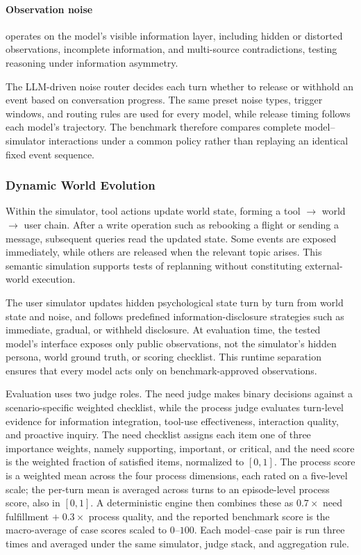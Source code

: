 \paragraph{Observation noise} operates on the model's visible information layer, including hidden or distorted observations, incomplete information, and multi-source contradictions, testing reasoning under information asymmetry.

The LLM-driven noise router decides each turn whether to release or withhold an event based on conversation progress. The same preset noise types, trigger windows, and routing rules are used for every model, while release timing follows each model's trajectory. The benchmark therefore compares complete model--simulator interactions under a common policy rather than replaying an identical fixed event sequence.

\subsubsection{Dynamic World Evolution}
\label{sec:livingbench_world}

Within the simulator, tool actions update world state, forming a tool $\to$ world $\to$ user chain. After a write operation such as rebooking a flight or sending a message, subsequent queries read the updated state. Some events are exposed immediately, while others are released when the relevant topic arises. This semantic simulation supports tests of replanning without constituting external-world execution.

The user simulator updates hidden psychological state turn by turn from world state and noise, and follows predefined information-disclosure strategies such as immediate, gradual, or withheld disclosure. At evaluation time, the tested model's interface exposes only public observations, not the simulator's hidden persona, world ground truth, or scoring checklist. This runtime separation ensures that every model acts only on benchmark-approved observations.

Evaluation uses two judge roles. The need judge makes binary decisions against a scenario-specific weighted checklist, while the process judge evaluates turn-level evidence for information integration, tool-use effectiveness, interaction quality, and proactive inquiry. The need checklist assigns each item one of three importance weights, namely supporting, important, or critical, and the need score is the weighted fraction of satisfied items, normalized to $[0,1]$. The process score is a weighted mean across the four process dimensions, each rated on a five-level scale; the per-turn mean is averaged across turns to an episode-level process score, also in $[0,1]$. A deterministic engine then combines these as $0.7\times$ need fulfillment $+\;0.3\times$ process quality, and the reported benchmark score is the macro-average of case scores scaled to $0$--$100$. Each model--case pair is run three times and averaged under the same simulator, judge stack, and aggregation rule.


